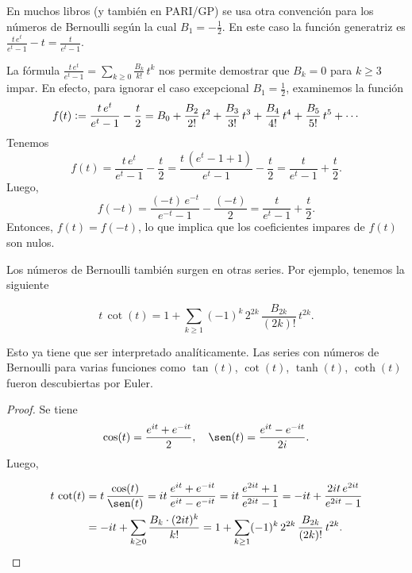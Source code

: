 \documentclass{article}
\begin{document}
En muchos libros (y también en PARI/GP) se usa otra convención para los números de Bernoulli según la cual $B_1 = -\frac{1}{2}$. En este caso la función generatriz es $\frac{t\,e^t}{e^t - 1} - t = \frac{t}{e^t - 1}$.

\begin{ejemplo*}
La fórmula $\frac{t\,e^t}{e^t - 1} = \sum_{k \ge 0} \frac{B_k}{k!}\,t^k$ nos permite demostrar que $B_k = 0$ para $k \ge 3$ impar. En efecto, para ignorar el caso excepcional $B_1 = \frac{1}{2}$, examinemos la función
$$f (t) \mathrel{\mathop:}= \frac{t\,e^t}{e^t - 1} - \frac{t}{2} = B_0 + \frac{B_2}{2!}\,t^2 + \frac{B_3}{3!}\,t^3 + \frac{B_4}{4!}\,t^4 + \frac{B_5}{5!}\,t^5 + \cdots$$
Tenemos
$$f (t) = \frac{t\,e^t}{e^t - 1} - \frac{t}{2} = \frac{t\,(e^t - 1 + 1)}{e^t - 1} - \frac{t}{2} = \frac{t}{e^t - 1} + \frac{t}{2}.$$
Luego,
$$f (-t) = \frac{(-t)\,e^{-t}}{e^{-t}-1} - \frac{(-t)}{2} = \frac{t}{e^t - 1} + \frac{t}{2}.$$
Entonces, $f (t) = f (-t)$, lo que implica que los coeficientes impares de $f (t)$ son nulos.
\end{ejemplo*}

Los números de Bernoulli también surgen en otras series. Por ejemplo, tenemos la siguiente

\begin{proposicion*}
$$t\,\cot (t) = 1 + \sum_{k \ge 1} (-1)^k \, 2^{2k}\,\frac{B_{2k}}{(2k)!}\,t^{2k}.$$
\end{proposicion*}

\noindent Esto ya tiene que ser interpretado analíticamente. Las series con números de Bernoulli para varias funciones como $\tan (t)$, $\cot (t)$, $\tanh (t)$, $\coth (t)$ fueron descubiertas por Euler.

\begin{proof}
Se tiene
$$\cos (t) = \frac{e^{it} + e^{-it}}{2}, \quad \sen (t) = \frac{e^{it} - e^{-it}}{2i}.$$
Luego,

\begin{align*}
t\,\cot (t) & = t\,\frac{\cos (t)}{\sen (t)} = it\,\frac{e^{it} + e^{-it}}{e^{it} - e^{-it}} = it\,\frac{e^{2it} + 1}{e^{2it} - 1} = -it + \frac{2it \, e^{2it}}{e^{2it} - 1}\\
 & = -it + \sum_{k \ge 0} \frac{B_k\cdot (2it)^k}{k!} = 1 + \sum_{k \ge 1} (-1)^k \, 2^{2k} \, \frac{B_{2k}}{(2k)!}\,t^{2k}.
\end{align*}
\end{proof}
\end{document}
